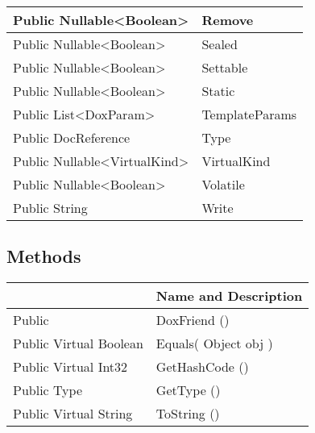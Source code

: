 \documentclass[11pt, oneside, a4paper]{book}
\begin{document}
\begin{center}
\begin{tabular}{| p{3cm} | p{12cm} | }
\hline
 Public  Nullable<Boolean> &  Remove\hypertarget{SoftwareEngineeringTools.{}Documentation.{}DoxFriend.{}Remove}{}\\
\hline
 Public  Nullable<Boolean> &  Sealed\hypertarget{SoftwareEngineeringTools.{}Documentation.{}DoxFriend.{}Sealed}{}\\
\hline
 Public  Nullable<Boolean> &  Settable\hypertarget{SoftwareEngineeringTools.{}Documentation.{}DoxFriend.{}Settable}{}\\
\hline
 Public  Nullable<Boolean> &  Static\hypertarget{SoftwareEngineeringTools.{}Documentation.{}DoxFriend.{}Static}{}\\
\hline
 Public  List<DoxParam> &  TemplateParams\hypertarget{SoftwareEngineeringTools.{}Documentation.{}DoxFriend.{}TemplateParams}{}\\
\hline
 Public  DocReference &  Type\hypertarget{SoftwareEngineeringTools.{}Documentation.{}DoxFriend.{}Type}{}\\
\hline
 Public  Nullable<VirtualKind> &  VirtualKind\hypertarget{SoftwareEngineeringTools.{}Documentation.{}DoxFriend.{}VirtualKind}{}\\
\hline
 Public  Nullable<Boolean> &  Volatile\hypertarget{SoftwareEngineeringTools.{}Documentation.{}DoxFriend.{}Volatile}{}\\
\hline
 Public  String &  Write\hypertarget{SoftwareEngineeringTools.{}Documentation.{}DoxFriend.{}Write}{}\\
\hline
\end{tabular}
\end{center}

\subsection{Methods}
\begin{center}
\begin{tabular}{| p{3cm} | p{12cm} | }
\hline
\textbf{ } & \textbf{ Name and Description}\\
\hline
 Public  &  DoxFriend ()\hypertarget{SoftwareEngineeringTools.{}Documentation.{}DoxFriend.{}DoxFriend}{}\\
\hline
 Public  Virtual  Boolean &  Equals(\hypertarget{SoftwareEngineeringTools.{}Documentation.{}DoxFriend.{}Equals\_Object}{} Object  obj  )\\
\hline
 Public  Virtual  Int32 &  GetHashCode ()\hypertarget{SoftwareEngineeringTools.{}Documentation.{}DoxFriend.{}GetHashCode}{}\\
\hline
 Public  Type &  GetType ()\hypertarget{SoftwareEngineeringTools.{}Documentation.{}DoxFriend.{}GetType}{}\\
\hline
 Public  Virtual  String &  ToString ()\hypertarget{SoftwareEngineeringTools.{}Documentation.{}DoxFriend.{}ToString}{}\\
\hline
\end{tabular}
\end{center}
 
\end{document}

